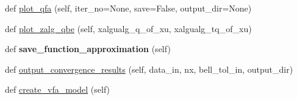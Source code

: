 \begin{DoxyCompactItemize}
\item 
def \mbox{\hyperlink{classgddp_1_1qfa_1_1_q_f_approximator_ae727d0246dd3d97387b73e17ca19ee33}{plot\+\_\+qfa}} (self, iter\+\_\+no=None, save=False, output\+\_\+dir=None)
\item 
def \mbox{\hyperlink{classgddp_1_1qfa_1_1_q_f_approximator_ade147379e2e5a350b9545a07ac15d533}{plot\+\_\+zalg\+\_\+qbe}} (self, xalgualg\+\_\+q\+\_\+of\+\_\+xu, xalgualg\+\_\+tq\+\_\+of\+\_\+xu)
\item 
\mbox{\label{classgddp_1_1qfa_1_1_q_f_approximator_a6d3c99d233cc1a906281eae4ccf91dbe}} 
def {\bfseries save\+\_\+function\+\_\+approximation} (self)
\item 
def \mbox{\hyperlink{classgddp_1_1qfa_1_1_q_f_approximator_a9d399c0b2d3a45f5274805575945e183}{output\+\_\+convergence\+\_\+results}} (self, data\+\_\+in, nx, bell\+\_\+tol\+\_\+in, output\+\_\+dir)
\item 
def \mbox{\hyperlink{classgddp_1_1qfa_1_1_q_f_approximator_a955edba3bc147309cbc8d786e6cbc2db}{create\+\_\+vfa\+\_\+model}} (self)
\end{DoxyCompactItemize}
